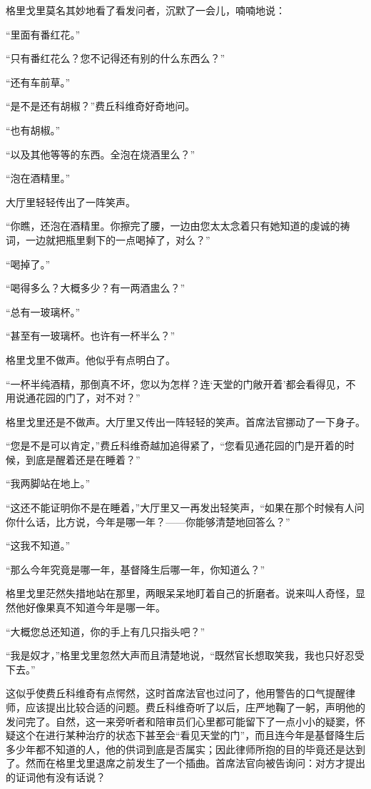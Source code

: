 \par 格里戈里莫名其妙地看了看发问者，沉默了一会儿，喃喃地说：
\par “里面有番红花。”
\par “只有番红花么？您不记得还有别的什么东西么？”
\par “还有车前草。”
\par “是不是还有胡椒？”费丘科维奇好奇地问。
\par “也有胡椒。”
\par “以及其他等等的东西。全泡在烧酒里么？”
\par “泡在酒精里。”
\par 大厅里轻轻传出了一阵笑声。
\par “你瞧，还泡在酒精里。你擦完了腰，一边由您太太念着只有她知道的虔诚的祷词，一边就把瓶里剩下的一点喝掉了，对么？”
\par “喝掉了。”
\par “喝得多么？大概多少？有一两酒盅么？”
\par “总有一玻璃杯。”
\par “甚至有一玻璃杯。也许有一杯半么？”
\par 格里戈里不做声。他似乎有点明白了。
\par “一杯半纯酒精，那倒真不坏，您以为怎样？连‘天堂的门敞开着’都会看得见，不用说通花园的门了，对不对？”
\par 格里戈里还是不做声。大厅里又传出一阵轻轻的笑声。首席法官挪动了一下身子。
\par “您是不是可以肯定，”费丘科维奇越加追得紧了，“您看见通花园的门是开着的时候，到底是醒着还是在睡着？”
\par “我两脚站在地上。”
\par “这还不能证明你不是在睡着，”大厅里又一再发出轻笑声，“如果在那个时候有人问你什么话，比方说，今年是哪一年？——你能够清楚地回答么？”
\par “这我不知道。”
\par “那么今年究竟是哪一年，基督降生后哪一年，你知道么？”
\par 格里戈里茫然失措地站在那里，两眼呆呆地盯着自己的折磨者。说来叫人奇怪，显然他好像果真不知道今年是哪一年。
\par “大概您总还知道，你的手上有几只指头吧？”
\par “我是奴才，”格里戈里忽然大声而且清楚地说，“既然官长想取笑我，我也只好忍受下去。”
\par 这似乎使费丘科维奇有点愕然，这时首席法官也过问了，他用警告的口气提醒律师，应该提出比较合适的问题。费丘科维奇听了以后，庄严地鞠了一躬，声明他的发问完了。自然，这一来旁听者和陪审员们心里都可能留下了一点小小的疑窦，怀疑这个在进行某种治疗的状态下甚至会“看见天堂的门”，而且连今年是基督降生后多少年都不知道的人，他的供词到底是否属实；因此律师所抱的目的毕竟还是达到了。然而在格里戈里退席之前发生了一个插曲。首席法官向被告询问：对方才提出的证词他有没有话说？
